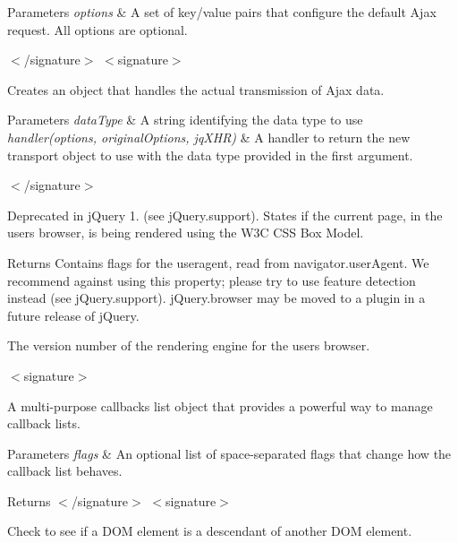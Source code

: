 \begin{DoxyParams}{Parameters}
{\em options} & A set of key/value pairs that configure the default Ajax request. All options are optional.\\
\hline
\end{DoxyParams}
$<$/signature$>$ $<$signature$>$ 

Creates an object that handles the actual transmission of Ajax data.


\begin{DoxyParams}{Parameters}
{\em data\+Type} & A string identifying the data type to use\\
\hline
{\em handler(options, original\+Options, jq\+X\+H\+R)} & A handler to return the new transport object to use with the data type provided in the first argument.\\
\hline
\end{DoxyParams}
$<$/signature$>$ 

Deprecated in j\+Query 1. (see j\+Query.\+support). States if the current page, in the user\textquotesingle{}s browser, is being rendered using the W3\+C C\+S\+S Box Model.

\begin{DoxyReturn}{Returns}
Contains flags for the useragent, read from navigator.\+user\+Agent. We recommend against using this property; please try to use feature detection instead (see j\+Query.\+support). j\+Query.\+browser may be moved to a plugin in a future release of j\+Query.

The version number of the rendering engine for the user\textquotesingle{}s browser.

$<$signature$>$ 

A multi-\/purpose callbacks list object that provides a powerful way to manage callback lists.
\end{DoxyReturn}

\begin{DoxyParams}{Parameters}
{\em flags} & An optional list of space-\/separated flags that change how the callback list behaves.\\
\hline
\end{DoxyParams}
\begin{DoxyReturn}{Returns}
$<$/signature$>$ $<$signature$>$ 

Check to see if a D\+O\+M element is a descendant of another D\+O\+M element.
\end{DoxyReturn}

